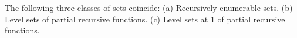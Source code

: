 The following three classes of sets coincide:
(a) Recursively enumerable sets.
(b) Level sets of partial recursive functions.
(c) Level sets at 1 of partial recursive functions.